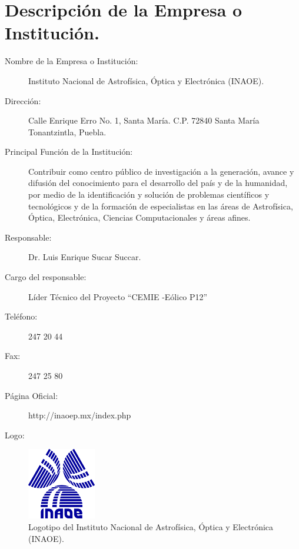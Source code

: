 \section{Descripción de la Empresa o Institución.}

\begin{description}
	\item [Nombre de la Empresa o Institución:] Instituto Nacional de Astrofísica, Óptica y Electrónica (INAOE).
	\item [Dirección:] Calle Enrique Erro No. 1, Santa María. C.P. 72840 Santa María Tonantzintla, Puebla.
	\item [Principal Función de la Institución:] Contribuir como centro público de investigación a la generación, avance y difusión del conocimiento para el desarrollo del país y de la humanidad, por medio de la identificación y solución de problemas científicos y tecnológicos y de la formación de especialistas en las áreas de Astrofísica, Óptica, Electrónica, Ciencias Computacionales y áreas afines.
    \item [Responsable:] Dr. Luis Enrique Sucar Succar.
    \item [Cargo del responsable:] Líder Técnico del Proyecto “CEMIE -Eólico P12”
    \item [Teléfono:] 247 20 44
    \item [Fax:] 247 25 80
    \item [Página Oficial:] http://inaoep.mx/index.php
    \item [Logo:] 
\end{description}

\begin{figure}[!h]
	\centering
	\includegraphics[width=3cm]{img/inaoe.png}
    \caption{Logotipo del Instituto Nacional de Astrofísica, Óptica y Electrónica (INAOE).}
\end{figure}

